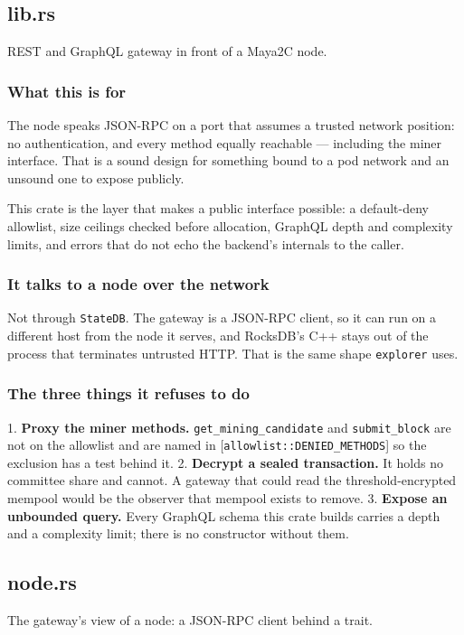 \documentclass[11pt,a4paper]{article}
\begin{document}
\subsection{lib.rs}
REST and GraphQL gateway in front of a Maya2C node.

\subsubsection{What this is for}

The node speaks JSON-RPC on a port that assumes a trusted network position:
no authentication, and every method equally reachable — including the miner
interface. That is a sound design for something bound to a pod network and
an unsound one to expose publicly.

This crate is the layer that makes a public interface possible: a
default-deny allowlist, size ceilings checked before allocation, GraphQL
depth and complexity limits, and errors that do not echo the backend's
internals to the caller.

\subsubsection{It talks to a node over the network}

Not through \texttt{StateDB}. The gateway is a JSON-RPC client, so it can run on a
different host from the node it serves, and RocksDB's C++ stays out of the
process that terminates untrusted HTTP. That is the same shape \texttt{explorer}
uses.

\subsubsection{The three things it refuses to do}

1. \textbf{Proxy the miner methods.} \texttt{get\_mining\_candidate} and \texttt{submit\_block}
   are not on the allowlist and are named in [\texttt{allowlist::DENIED\_METHODS}]
   so the exclusion has a test behind it.
2. \textbf{Decrypt a sealed transaction.} It holds no committee share and cannot.
   A gateway that could read the threshold-encrypted mempool would be the
   observer that mempool exists to remove.
3. \textbf{Expose an unbounded query.} Every GraphQL schema this crate builds
   carries a depth and a complexity limit; there is no constructor without
   them.

\subsection{node.rs}
The gateway's view of a node: a JSON-RPC client behind a trait.
\end{document}
